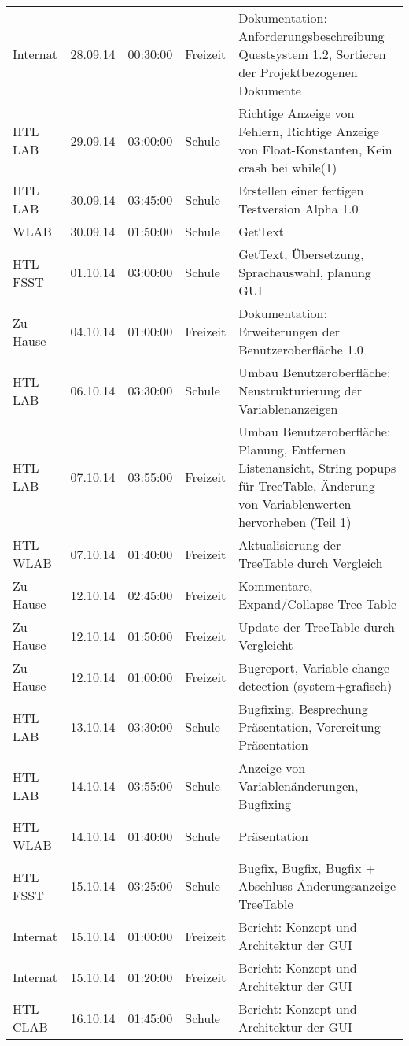 \begin{small}
\begin{longtable}{ p{} p{} p{} p{} p{}}
Internat	& 28.09.14	& 00:30:00	& Freizeit	& Dokumentation: Anforderungsbeschreibung Questsystem 1.2, Sortieren der Projektbezogenen Dokumente \\
HTL LAB	& 29.09.14	& 03:00:00	& Schule	& Richtige Anzeige von Fehlern, Richtige Anzeige von Float-Konstanten, Kein crash bei while(1) \\
HTL LAB	& 30.09.14	& 03:45:00	& Schule	& Erstellen einer fertigen Testversion Alpha 1.0 \\
WLAB	& 30.09.14	& 01:50:00	& Schule	& GetText \\
HTL FSST	& 01.10.14	& 03:00:00	& Schule	& GetText, \"Ubersetzung, Sprachauswahl, planung GUI \\
Zu Hause	& 04.10.14	& 01:00:00	& Freizeit	& Dokumentation: Erweiterungen der Benutzeroberfl\"ache 1.0 \\
HTL LAB	& 06.10.14	& 03:30:00	& Schule	& Umbau Benutzeroberfl\"ache: Neustrukturierung der Variablenanzeigen \\
HTL LAB	& 07.10.14	& 03:55:00	& Freizeit	& Umbau Benutzeroberfl\"ache: Planung, Entfernen Listenansicht, String popups f\"ur TreeTable, \"Anderung von Variablenwerten hervorheben (Teil 1) \\
HTL WLAB	& 07.10.14	& 01:40:00	& Freizeit	& Aktualisierung der TreeTable durch Vergleich \\
Zu Hause	& 12.10.14	& 02:45:00	& Freizeit	& Kommentare, Expand/Collapse Tree Table \\
Zu Hause	& 12.10.14	& 01:50:00	& Freizeit	& Update der TreeTable durch Vergleicht \\
Zu Hause	& 12.10.14	& 01:00:00	& Freizeit	& Bugreport, Variable change detection (system+grafisch) \\
HTL LAB	& 13.10.14	& 03:30:00	& Schule	& Bugfixing, Besprechung Pr\"asentation, Vorereitung Pr\"asentation \\
HTL LAB	& 14.10.14	& 03:55:00	& Schule	& Anzeige von Variablen\"anderungen, Bugfixing \\
HTL WLAB	& 14.10.14	& 01:40:00	& Schule	& Pr\"asentation \\
HTL FSST	& 15.10.14	& 03:25:00	& Schule	& Bugfix, Bugfix, Bugfix + Abschluss \"Anderungsanzeige TreeTable \\
Internat	& 15.10.14	& 01:00:00	& Freizeit	& Bericht: Konzept und Architektur der GUI \\
Internat	& 15.10.14	& 01:20:00	& Freizeit	& Bericht: Konzept und Architektur der GUI \\
HTL CLAB	& 16.10.14	& 01:45:00	& Schule	& Bericht: Konzept und Architektur der GUI \\

\end{longtable}
\end{small}
